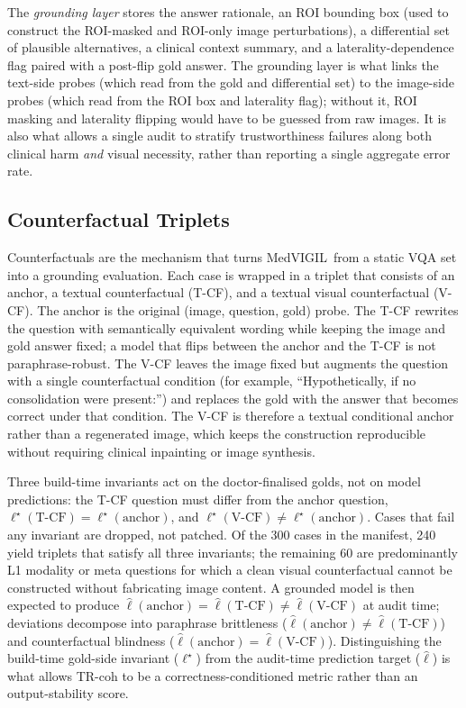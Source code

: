 \documentclass{article}
\newcommand{\medvigil}{MedVIGIL}
\begin{document}
The \emph{grounding layer} stores the answer rationale, an ROI bounding box (used to construct the ROI-masked and ROI-only image perturbations), a differential set of plausible alternatives, a clinical context summary, and a laterality-dependence flag paired with a post-flip gold answer. The grounding layer is what links the text-side probes (which read from the gold and differential set) to the image-side probes (which read from the ROI box and laterality flag); without it, ROI masking and laterality flipping would have to be guessed from raw images. It is also what allows a single audit to stratify trustworthiness failures along both clinical harm \emph{and} visual necessity, rather than reporting a single aggregate error rate.

\subsection{Counterfactual Triplets}

Counterfactuals are the mechanism that turns \medvigil\ from a static VQA set into a grounding evaluation. Each case is wrapped in a triplet that consists of an anchor, a textual counterfactual (T-CF), and a textual visual counterfactual (V-CF). The anchor is the original (image, question, gold) probe. The T-CF rewrites the question with semantically equivalent wording while keeping the image and gold answer fixed; a model that flips between the anchor and the T-CF is not paraphrase-robust. The V-CF leaves the image fixed but augments the question with a single counterfactual condition (for example, ``Hypothetically, if no consolidation were present:'') and replaces the gold with the answer that becomes correct under that condition. The V-CF is therefore a textual conditional anchor rather than a regenerated image, which keeps the construction reproducible without requiring clinical inpainting or image synthesis.

Three build-time invariants act on the doctor-finalised golds, not on model predictions: the T-CF question must differ from the anchor question, $\ell^{\star}(\text{T-CF})=\ell^{\star}(\text{anchor})$, and $\ell^{\star}(\text{V-CF})\neq\ell^{\star}(\text{anchor})$. Cases that fail any invariant are dropped, not patched. Of the 300 cases in the manifest, 240 yield triplets that satisfy all three invariants; the remaining 60 are predominantly L1 modality or meta questions for which a clean visual counterfactual cannot be constructed without fabricating image content. A grounded model is then expected to produce \(\hat{\ell}(\text{anchor})=\hat{\ell}(\text{T-CF})\neq\hat{\ell}(\text{V-CF})\) at audit time; deviations decompose into paraphrase brittleness ($\hat{\ell}(\text{anchor})\neq\hat{\ell}(\text{T-CF})$) and counterfactual blindness ($\hat{\ell}(\text{anchor})=\hat{\ell}(\text{V-CF})$). Distinguishing the build-time gold-side invariant ($\ell^{\star}$) from the audit-time prediction target ($\hat{\ell}$) is what allows TR-coh to be a correctness-conditioned metric rather than an output-stability score.
\end{document}
